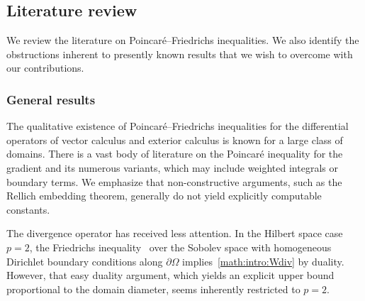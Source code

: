 \documentclass[10pt,a4paper]{article}
\begin{document}
\subsection{Literature review}


We review the literature on Poincar\'e--Friedrichs inequalities. We also identify the obstructions inherent to presently known results that we wish to overcome with our contributions. 

\subsubsection{General results}

The qualitative existence of Poincar\'e--Friedrichs inequalities for the differential operators of vector calculus and exterior calculus is known for a large class of domains.
There is a vast body of literature on the Poincar\'e inequality for the gradient and its numerous variants,
which may include weighted integrals or boundary terms.
We emphasize that non-constructive arguments, such as the Rellich embedding theorem, generally do not yield explicitly computable constants.

The divergence operator has received less attention.
In the Hilbert space case $p=2$, the Friedrichs inequality~\cite{burenkov1998sobolev} over the Sobolev space
with homogeneous Dirichlet boundary conditions along $\partial \Omega$ implies~\eqref{math:intro:Wdiv} by duality.
However, that easy duality argument, which yields an explicit upper bound proportional to the domain diameter, seems inherently restricted to $p=2$.

\end{document}
